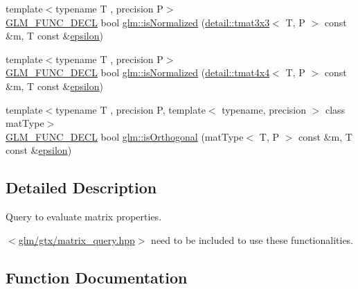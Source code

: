 \begin{DoxyCompactItemize}
\item 
{\footnotesize template$<$typename T , precision P$>$ }\\\hyperlink{setup_8hpp_ab2d052de21a70539923e9bcbf6e83a51}{G\+L\+M\+\_\+\+F\+U\+N\+C\+\_\+\+D\+E\+CL} bool \hyperlink{group__gtx__matrix__query_gab4c4106cd851951bad5e78a83bfc75dd}{glm\+::is\+Normalized} (\hyperlink{structglm_1_1detail_1_1tmat3x3}{detail\+::tmat3x3}$<$ T, P $>$ const \&m, T const \&\hyperlink{group__gtc__constants_gacb41049b8d22c8aa90e362b96c524feb}{epsilon})
\item 
{\footnotesize template$<$typename T , precision P$>$ }\\\hyperlink{setup_8hpp_ab2d052de21a70539923e9bcbf6e83a51}{G\+L\+M\+\_\+\+F\+U\+N\+C\+\_\+\+D\+E\+CL} bool \hyperlink{group__gtx__matrix__query_gad0ff11cc2c26d3086d9f88316a321637}{glm\+::is\+Normalized} (\hyperlink{structglm_1_1detail_1_1tmat4x4}{detail\+::tmat4x4}$<$ T, P $>$ const \&m, T const \&\hyperlink{group__gtc__constants_gacb41049b8d22c8aa90e362b96c524feb}{epsilon})
\item 
{\footnotesize template$<$typename T , precision P, template$<$ typename, precision $>$ class mat\+Type$>$ }\\\hyperlink{setup_8hpp_ab2d052de21a70539923e9bcbf6e83a51}{G\+L\+M\+\_\+\+F\+U\+N\+C\+\_\+\+D\+E\+CL} bool \hyperlink{group__gtx__matrix__query_gab2cb5d23df77b4e4e63ad2965acd31b3}{glm\+::is\+Orthogonal} (mat\+Type$<$ T, P $>$ const \&m, T const \&\hyperlink{group__gtc__constants_gacb41049b8d22c8aa90e362b96c524feb}{epsilon})
\end{DoxyCompactItemize}


\subsection{Detailed Description}
Query to evaluate matrix properties. 

$<$\hyperlink{matrix__query_8hpp}{glm/gtx/matrix\+\_\+query.\+hpp}$>$ need to be included to use these functionalities. 

\subsection{Function Documentation}
\mbox{\label{group__gtx__matrix__query_gafc1ce12c738b8c5d007179e615609330}} 
